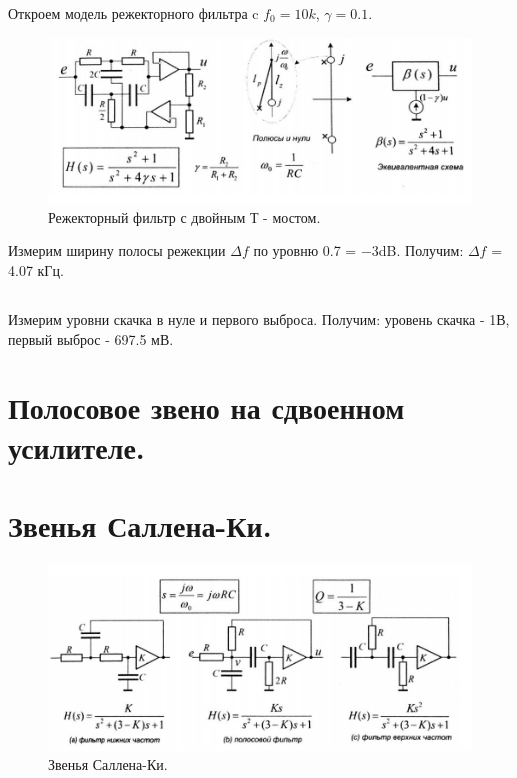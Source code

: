 \documentclass[a4paper, 12pt]{article}%
\begin{document}
Откроем модель режекторного фильтра c $f_0 = 10k$, $\gamma = 0.1$.

\begin{figure}[h!]
    \centering
    \includegraphics[width=1\linewidth]{pic9.png}
    \caption{Режекторный фильтр с двойным Т - мостом.}
\end{figure}

Измерим ширину полосы режекции $\Delta f$ по уровню 0.7 = −3dB. Получим: $\Delta f$ = 4.07 кГц.

\subsection{}


Измерим уровни скачка в нуле и первого выброса. Получим: уровень скачка - 1В, первый выброс - 697.5 мВ.

\newpage





\section{Полосовое звено на сдвоенном усилителе.}





\newpage
{}
\section{Звенья Саллена-Ки.}

\begin{figure}[h!]
    \centering
    \includegraphics[width=1\linewidth]{pic10.png}
    \caption{Звенья Саллена-Ки.}
\end{figure}
\end{document}
